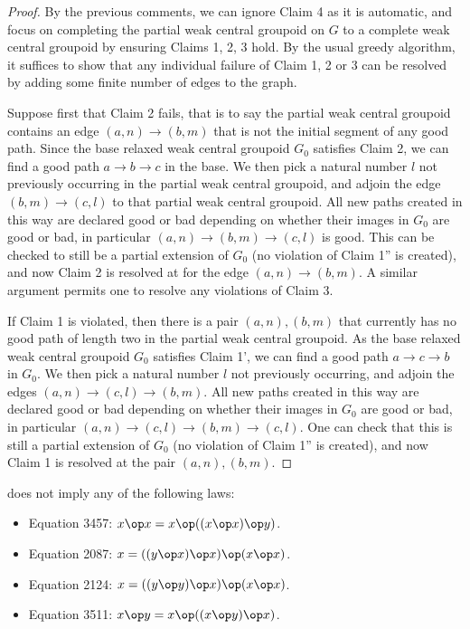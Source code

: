 \begin{proof}
  By the previous comments, we can ignore Claim 4 as it is automatic, and focus on completing the partial weak central groupoid on $G$ to a complete weak central groupoid by ensuring Claims 1, 2, 3 hold. By the usual greedy algorithm, it suffices to show that any individual failure of Claim 1, 2 or 3 can be resolved by adding some finite number of edges to the graph.

  Suppose first that Claim 2 fails, that is to say the partial weak central groupoid contains an edge $(a,n) \to (b,m)$ that is not the initial segment of any good path. Since the base relaxed weak central groupoid $G_0$ satisfies Claim 2, we can find a good path $a \to b \to c$ in the base. We then pick a natural number $l$ not previously occurring in the partial weak central groupoid, and adjoin the edge $(b,m) \to (c,l)$ to that partial weak central groupoid. All new paths created in this way are declared good or bad depending on whether their images in $G_0$ are good or bad, in particular $(a,n) \to (b,m) \to (c,l)$ is good. This can be checked to still be a partial extension of $G_0$ (no violation of Claim 1'' is created), and now Claim 2 is resolved at for the edge $(a,n) \to (b,m)$. A similar argument permits one to resolve any violations of Claim 3.

  If Claim 1 is violated, then there is a pair $(a,n), (b,m)$ that currently has no good path of length two in the partial weak central groupoid. As the base relaxed weak central groupoid $G_0$ satisfies Claim 1', we can find a good path $a \to c \to b$ in $G_0$. We then pick a natural number $l$ not previously occurring, and adjoin the edges $(a,n) \to (c,l) \to (b,m)$. All new paths created in this way are declared good or bad depending on whether their images in $G_0$ are good or bad, in particular $(a,n) \to (c,l) \to (b,m) \to (c,l)$. One can check that this is still a partial extension of $G_0$ (no violation of Claim 1'' is created), and now Claim 1 is resolved at the pair $(a,n), (b,m)$.
\end{proof}

\begin{theorem}\label{1485-refutes}\leanok{}
   does not imply any of the following laws:
  \begin{itemize}
   \item Equation 3457: $x \op x = x \op ((x \op x) \op y)$.
   \item Equation 2087: $x = ((y \op x) \op x) \op (x \op x)$.
   \item Equation 2124: $x = ((y \op y) \op x) \op (x \op x)$.
   \item Equation 3511: $x \op y = x \op ((x \op y) \op x)$.
  \end{itemize}
\end{theorem}

